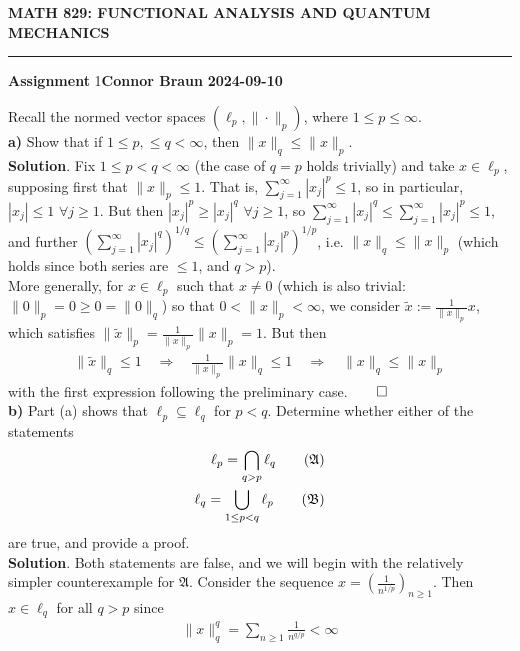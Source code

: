 \documentclass[10pt]{article}
\newcommand{\1}[1]{\mathbbm{1}_{#1}}
\begin{document}
    \begin{center}
        {\bf\large{MATH 829: FUNCTIONAL ANALYSIS AND QUANTUM MECHANICS}}
        \smallskip
        \hrule
        \smallskip
        {\bf Assignment} 1\hfill {\bf Connor Braun} \hfill {\bf 2024-09-10}
    \end{center}
    \vspace{5pt}
     Recall the normed vector spaces $(\ell_p,\|\cdot\|_p)$,
    where $1\leq p\leq \infty$.\\[5pt]
    {\bf a)} Show that if $1\leq p,\leq q<\infty$, then $\|x\|_q\leq
    \|x\|_p$.\\[5pt]
    {\bf Solution}. Fix $1\leq p<q<\infty$ (the case of $q=p$ holds trivially)
    and take $x\in\ell_p$, supposing first that $\|x\|_p\leq 1$. That is,
    $\sum_{j=1}^\infty|x_j|^p\leq 1$, so in particular, $|x_j|\leq 1$ $\forall
    j\geq 1$. But then $|x_j|^p\geq |x_j|^q$ $\forall j\geq 1$, so
    $\sum_{j=1}^\infty|x_j|^q\leq \sum_{j=1}^\infty|x_j|^p\leq 1$, and further
    $(\sum_{j=1}^\infty|x_j|^q)^{1/q}\leq (\sum_{j=1}^\infty|x_j|^p)^{1/p}$,
    i.e. $\|x\|_q\leq\|x\|_p$ (which holds since both series are $\leq 1$, and
    $q>p$).\\[5pt]
    More generally, for $x\in\ell_p$ such that $x\neq 0$ (which is also trivial:
    $\|0\|_p=0\geq 0=\|0\|_q$) so that $0<\|x\|_p<\infty$, we consider
    $\tilde{x}:=\tfrac{1}{\|x\|_p}x$, which satisfies
    $\|\tilde{x}\|_p=\tfrac{1}{\|x\|_p}\|x\|_p=1$. But then
    \begin{align*}
        \|\tilde{x}\|_q\leq 1\quad\Rightarrow\quad\frac{1}{\|x\|_p}\|x\|_q\leq 1\quad\Rightarrow\quad \|x\|_q\leq\|x\|_p
    \end{align*}
    with the first expression following the preliminary
    case.\hfill{$\qed$}\\[5pt]
    {\bf b)} Part (a) shows that $\ell_p\subseteq\ell_q$ for $p<q$. Determine
    whether either of the statements
    \begin{align*}
        \ell_p=\bigcap_{q>p}\ell_q\tag{$\mathfrak{A}$}\\
        \ell_q=\bigcup_{1\leq p<q}\ell_p\tag{$\mathfrak{B}$}
    \end{align*}
    are true, and provide a proof.\\[5pt]
    {\bf Solution}. Both statements are false, and we will begin with the
    relatively simpler counterexample for $\mathfrak{A}$. Consider the sequence
    $x=(\tfrac{1}{n^{1/p}})_{n\geq 1}$. Then $x\in\ell_q$ for all $q>p$ since
    \begin{align*}
        \|x\|_q^q=\sum_{n\geq 1}\frac{1}{n^{q/p}}<\infty
    \end{align*}
\end{document}
